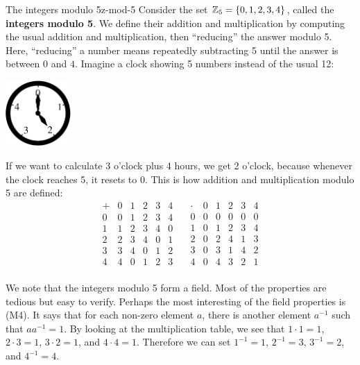 \begin{example}{The integers modulo 5}{z-mod-5}
  Consider the set $\mathbb{Z}_5=\{0,1,2,3,4\}$, called the
  \textbf{integers modulo 5}. We define their
  addition and multiplication by computing the usual addition and
  multiplication, then ``reducing'' the answer modulo 5. Here,
  ``reducing'' a number means repeatedly subtracting 5 until the
  answer is between $0$ and $4$. Imagine a clock showing 5 numbers
  instead of the usual 12:
  \begin{center}
    \includegraphics[width=2.5cm]{figures/clock}
  \end{center}
  If we want to calculate 3 o'clock plus 4 hours, we get 2 o'clock,
  because whenever the clock reaches 5, it resets to 0. This is how
  addition and multiplication modulo 5 are defined:
  \begin{equation*}
    \begin{array}{l|lllll}
      +&0&1&2&3&4 \\\hline
      0&0&1&2&3&4 \\
      1&1&2&3&4&0 \\
      2&2&3&4&0&1 \\
      3&3&4&0&1&2 \\
      4&4&0&1&2&3 \\
    \end{array}
    \quad
    \begin{array}{l|lllll}
      \cdot&0&1&2&3&4 \\\hline
      0&0&0&0&0&0 \\
      1&0&1&2&3&4 \\
      2&0&2&4&1&3 \\
      3&0&3&1&4&2 \\
      4&0&4&3&2&1 \\
    \end{array}
  \end{equation*}
\end{example}

We note that the integers modulo 5 form a field. Most of the
properties are tedious but easy to verify. Perhaps the most
interesting of the field properties is (M4). It says that for each
non-zero element $a$, there is another element $a^{-1}$ such that
$aa^{-1}=1$.  By looking at the multiplication table, we see that
$1\cdot 1=1$, $2\cdot 3=1$, $3\cdot 2=1$, and $4\cdot 4=1$. Therefore
we can set $1^{-1}=1$, $2^{-1}=3$, $3^{-1}=2$, and $4^{-1}=4$.

